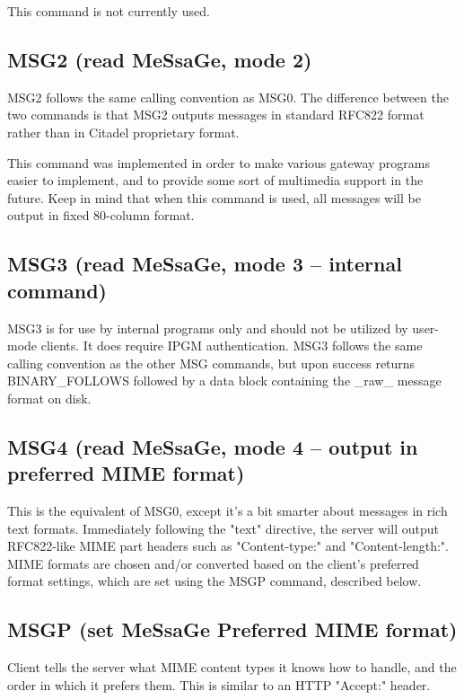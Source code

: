  This command is not currently used.



\subsection{MSG2 (read MeSsaGe, mode 2)}

 MSG2 follows the same calling convention as MSG0.  The difference between
the two commands is that MSG2 outputs messages in standard RFC822 format
rather than in Citadel proprietary format.

 This command was implemented in order to make various gateway programs
easier to implement, and to provide some sort of multimedia support in the
future.  Keep in mind that when this command is used, all messages will be
output in fixed 80-column format.



\subsection{MSG3 (read MeSsaGe, mode 3 -- internal command)}

 MSG3 is for use by internal programs only and should not be utilized by
user-mode clients.  It does require IPGM authentication.  MSG3 follows the
same calling convention as the other MSG commands, but upon success returns
BINARY_FOLLOWS followed by a data block containing the _raw_ message format
on disk.



\subsection{MSG4 (read MeSsaGe, mode 4 -- output in preferred MIME format)}

 This is the equivalent of MSG0, except it's a bit smarter about messages in
rich text formats.  Immediately following the "text" directive, the server
will output RFC822-like MIME part headers such as "Content-type:" and
"Content-length:".  MIME formats are chosen and/or converted based on the
client's preferred format settings, which are set using the MSGP command,
described below.



\subsection{MSGP (set MeSsaGe Preferred MIME format)}

 Client tells the server what MIME content types it knows how to handle, and
the order in which it prefers them.  This is similar to an HTTP "Accept:"
header.

